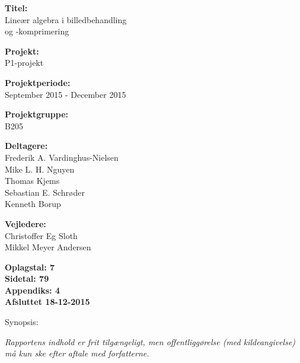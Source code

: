 \begin{minipage}[t]{0.48\textwidth}
\textbf{Titel:} \\[5pt]\hspace*{2ex}
Lineær algebra i billedbehandling \\\hspace*{2ex}
og -komprimering \\\hspace*{2ex}



\textbf{Projekt:} \\[5pt]\bigskip\hspace{2ex}
P1-projekt

\textbf{Projektperiode:} \\[5pt]\bigskip\hspace{2ex}
September 2015 - December 2015

\textbf{Projektgruppe:} \\[5pt]\bigskip\hspace{2ex}
B205

\textbf{Deltagere:} \\[5pt]\hspace*{2ex}
Frederik A. Vardinghus-Nielsen \\\hspace*{2ex}
Mike L. H. Nguyen \\\hspace*{2ex}
Thomas Kjems \\\hspace*{2ex}
Sebastian E. Schrøder \\\hspace*{2ex}
Kenneth Borup \\\hspace*{2ex}

\textbf{Vejledere:} \\[5pt]\hspace*{2ex}
Christoffer Eg Sloth  \\\bigskip\hspace{2ex}
Mikkel Meyer Andersen

\vspace*{1cm}

\textbf{Oplagstal: 7} \\
\textbf{Sidetal: 79} \\
\textbf{Appendiks: 4} \\ 
\textbf{Afsluttet 18-12-2015}

\end{minipage}
\hfill
\begin{minipage}[t]{0.483\textwidth}
Synopsis: \\[5pt]
\fbox{\parbox{7cm}{\bigskip\bigskip}}
\end{minipage}

\vfill

{\footnotesize\itshape Rapportens indhold er frit tilgængeligt, men offentliggørelse (med kildeangivelse) må kun ske efter aftale med forfatterne.}

